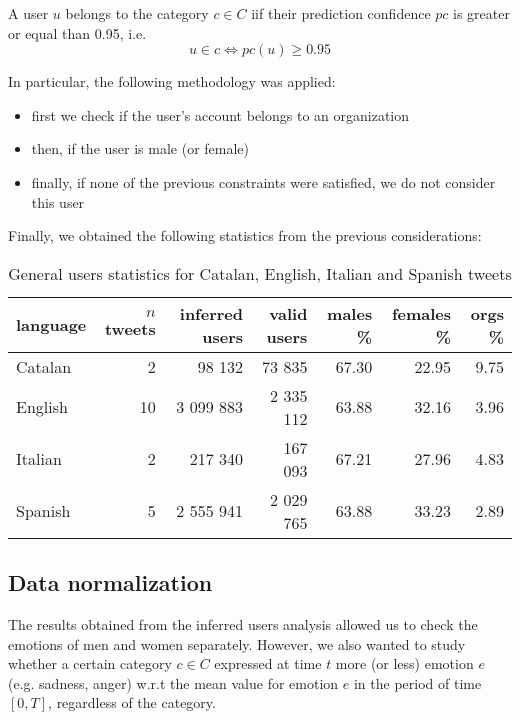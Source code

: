 \begin{definition}
\label{def:valid-users}
	A user \(u\) belongs to the category \(c \in C\) iif their prediction confidence \(pc\) is greater or equal than 0.95, i.e.
	\[u \in c \Longleftrightarrow pc(u) \geq 0.95\]
\end{definition}
	
In particular, the following methodology was applied:
	
\begin{itemize}
	\item first we check if the user's account belongs to an organization
	\item then, if the user is male (or female)
	\item finally, if none of the previous constraints were satisfied, we do not consider this user
\end{itemize}

Finally, we obtained the following statistics from the previous considerations:

\begin{table}[h]
	\centering
	\begin{tabular}{lrrrrrr}
		\toprule
		\textbf{language} & \textbf{\(n\) tweets} & \textbf{inferred users} & \textbf{valid users} & \textbf{males \%} & \textbf{females \%} & \textbf{orgs \%}
		\\
		\midrule
		Catalan & 2 & 98 132 & 73 835 & 67.30 & 22.95 & 9.75
		\\
		English & 10 & 3 099 883 & 2 335 112 & 63.88 & 32.16 & 3.96 
		\\
		Italian & 2 & 217 340 & 167 093 & 67.21 & 27.96 & 4.83 
		\\
		Spanish & 5 & 2 555 941 & 2 029 765 & 63.88 & 33.23 & 2.89 
		\\
		\bottomrule
	\end{tabular}
	\caption{General users statistics for Catalan, English, Italian and Spanish tweets}
	\label{tab:users-languages}
\end{table}

\subsection{Data normalization}
\label{subsec:normalization2}

The results obtained from the inferred users analysis allowed us to check the emotions of men and women separately. However, we also wanted to study whether a certain category \(c \in C\) expressed at time \(t\) more (or less) emotion \(e\) (e.g. sadness, anger) w.r.t the mean value for emotion \(e\) in the period of time \([0, T]\), regardless of the category.

